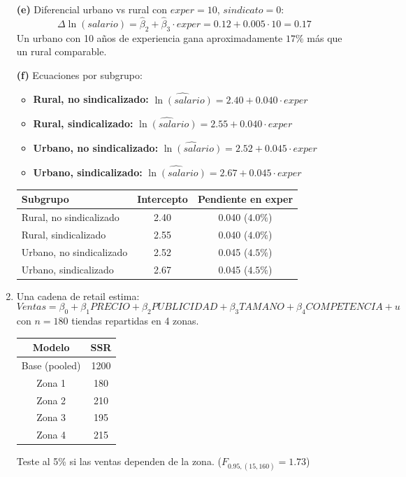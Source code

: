 \documentclass[11pt,a4paper]{article}
\begin{document}
\begin{enumerate}
\textbf{(e)} Diferencial urbano vs rural con $exper=10$, $sindicato=0$:
\[
\Delta \ln(salario) = \hat{\beta}_2 + \hat{\beta}_3 \cdot exper = 0.12 + 0.005 \cdot 10 = 0.17
\]
Un urbano con 10 años de experiencia gana aproximadamente $17\%$ más que un rural comparable.

\textbf{(f)} Ecuaciones por subgrupo:
\begin{itemize}[leftmargin=2em]
    \item \textbf{Rural, no sindicalizado:} $\widehat{\ln(salario)} = 2.40 + 0.040 \cdot exper$
    \item \textbf{Rural, sindicalizado:} $\widehat{\ln(salario)} = 2.55 + 0.040 \cdot exper$
    \item \textbf{Urbano, no sindicalizado:} $\widehat{\ln(salario)} = 2.52 + 0.045 \cdot exper$
    \item \textbf{Urbano, sindicalizado:} $\widehat{\ln(salario)} = 2.67 + 0.045 \cdot exper$
\end{itemize}

\begin{center}
\begin{tabular}{lcc}
\toprule
\textbf{Subgrupo} & \textbf{Intercepto} & \textbf{Pendiente en exper} \\
\midrule
Rural, no sindicalizado & 2.40 & 0.040 ($4.0\%$) \\
Rural, sindicalizado    & 2.55 & 0.040 ($4.0\%$) \\
Urbano, no sindicalizado & 2.52 & 0.045 ($4.5\%$) \\
Urbano, sindicalizado   & 2.67 & 0.045 ($4.5\%$) \\
\bottomrule
\end{tabular}
\end{center}

\item Una cadena de retail estima:
\[
Ventas = \beta_0 + \beta_1 PRECIO + \beta_2 PUBLICIDAD + \beta_3 TAMANO + \beta_4 COMPETENCIA + u
\]
con $n=180$ tiendas repartidas en 4 zonas.
\begin{center}
\begin{tabular}{|c|c|}
\hline
Modelo & SSR \\
\hline
Base (pooled) & 1200 \\
Zona 1 & 180 \\
Zona 2 & 210 \\
Zona 3 & 195 \\
Zona 4 & 215 \\
\hline
\end{tabular}
\end{center}
Teste al 5\% si las ventas dependen de la zona. ($F_{0.95,(15,160)} = 1.73$)



\end{enumerate}
\end{document}
